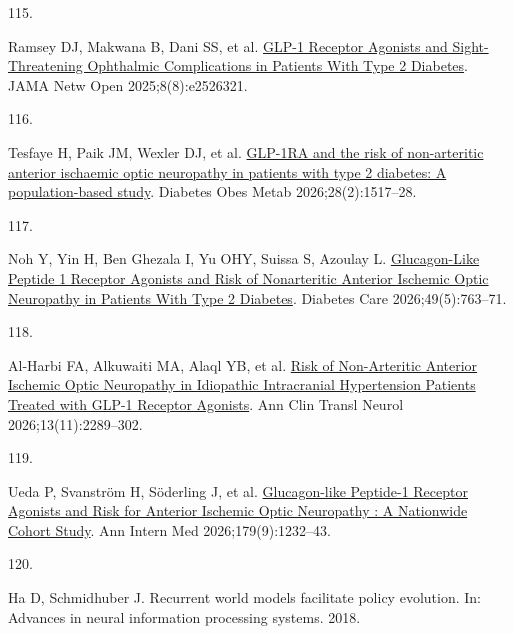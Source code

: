 \documentclass[
  11pt,
]{article}
\newlength{\cslhangindent}
\newlength{\csllabelwidth}
\newenvironment{CSLReferences}[2] %
 {\begin{list}{}{%
  \setlength{\itemindent}{0pt}
  \setlength{\leftmargin}{0pt}
  \setlength{\parsep}{0pt}
  \ifodd #1
   \setlength{\leftmargin}{\cslhangindent}
   \setlength{\itemindent}{-1\cslhangindent}
  \fi
  \setlength{\itemsep}{#2\baselineskip}}}
 {\end{list}}
\newcommand{\CSLLeftMargin}[1]{\parbox[t]{\csllabelwidth}{\strut#1\strut}}
\newcommand{\CSLRightInline}[1]{\parbox[t]{\linewidth - \csllabelwidth}{\strut#1\strut}}
\begin{document}
\begin{CSLReferences}{0}{1}
\CSLLeftMargin{115. }%
\CSLRightInline{Ramsey DJ, Makwana B, Dani SS, et al.
\href{https://doi.org/10.1001/jamanetworkopen.2025.26321}{{GLP-1
Receptor Agonists and Sight-Threatening Ophthalmic Complications in
Patients With Type 2 Diabetes}}. JAMA Netw Open 2025;8(8):e2526321. }

\CSLLeftMargin{116. }%
\CSLRightInline{Tesfaye H, Paik JM, Wexler DJ, et al.
\href{https://doi.org/10.1111/dom.70200}{{GLP-1RA and the risk of
non-arteritic anterior ischaemic optic neuropathy in patients with type
2 diabetes: A population-based study}}. Diabetes Obes Metab
2026;28(2):1517--28. }

\CSLLeftMargin{117. }%
\CSLRightInline{Noh Y, Yin H, Ben Ghezala I, Yu OHY, Suissa S, Azoulay
L. \href{https://doi.org/10.2337/dc25-2577}{{Glucagon-Like Peptide 1
Receptor Agonists and Risk of Nonarteritic Anterior Ischemic Optic
Neuropathy in Patients With Type 2 Diabetes}}. Diabetes Care
2026;49(5):763--71. }

\CSLLeftMargin{118. }%
\CSLRightInline{Al-Harbi FA, Alkuwaiti MA, Alaql YB, et al.
\href{https://doi.org/10.1002/acn3.70406}{{Risk of Non-Arteritic
Anterior Ischemic Optic Neuropathy in Idiopathic Intracranial
Hypertension Patients Treated with GLP-1 Receptor Agonists}}. Ann Clin
Transl Neurol 2026;13(11):2289--302. }

\CSLLeftMargin{119. }%
\CSLRightInline{Ueda P, Svanström H, Söderling J, et al.
\href{https://doi.org/10.7326/ANNALS-25-02096}{{Glucagon-like Peptide-1
Receptor Agonists and Risk for Anterior Ischemic Optic Neuropathy : A
Nationwide Cohort Study}}. Ann Intern Med 2026;179(9):1232--43. }

\CSLLeftMargin{120. }%
\CSLRightInline{Ha D, Schmidhuber J. Recurrent world models facilitate
policy evolution. In: Advances in neural information processing systems.
2018. }

\end{CSLReferences}
\end{document}
